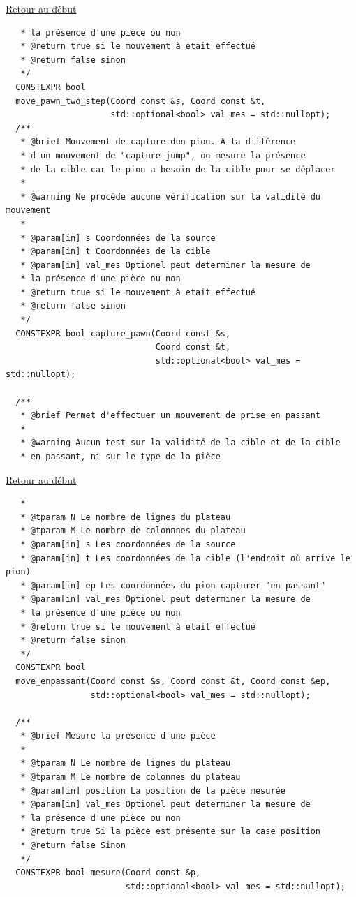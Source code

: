 {\begin{frame}[fragile]
\hyperlink{conclusion}{Retour au début}\newline
\begin{verbatim}
   * la présence d'une pièce ou non
   * @return true si le mouvement à etait effectué
   * @return false sinon
   */
  CONSTEXPR bool
  move_pawn_two_step(Coord const &s, Coord const &t,
                     std::optional<bool> val_mes = std::nullopt);
  /**
   * @brief Mouvement de capture dun pion. A la différence
   * d'un mouvement de "capture jump", on mesure la présence
   * de la cible car le pion a besoin de la cible pour se déplacer
   *
   * @warning Ne procède aucune vérification sur la validité du mouvement
   *
   * @param[in] s Coordonnées de la source
   * @param[in] t Coordonnées de la cible
   * @param[in] val_mes Optionel peut determiner la mesure de
   * la présence d'une pièce ou non
   * @return true si le mouvement à etait effectué
   * @return false sinon
   */
  CONSTEXPR bool capture_pawn(Coord const &s,
                              Coord const &t,
                              std::optional<bool> val_mes = std::nullopt);

  /**
   * @brief Permet d'effectuer un mouvement de prise en passant
   *
   * @warning Aucun test sur la validité de la cible et de la cible
   * en passant, ni sur le type de la pièce
\end{verbatim}
\end{frame}

\begin{frame}[fragile]
\hyperlink{conclusion}{Retour au début}\newline
\begin{verbatim}
   *
   * @tparam N Le nombre de lignes du plateau
   * @tparam M Le nombre de colonnnes du plateau
   * @param[in] s Les coordonnées de la source
   * @param[in] t Les coordonnées de la cible (l'endroit où arrive le pion)
   * @param[in] ep Les coordonnées du pion capturer "en passant"
   * @param[in] val_mes Optionel peut determiner la mesure de
   * la présence d'une pièce ou non
   * @return true si le mouvement à etait effectué
   * @return false sinon
   */
  CONSTEXPR bool
  move_enpassant(Coord const &s, Coord const &t, Coord const &ep,
                 std::optional<bool> val_mes = std::nullopt);

  /**
   * @brief Mesure la présence d'une pièce
   *
   * @tparam N Le nombre de lignes du plateau
   * @tparam M Le nombre de colonnes du plateau
   * @param[in] position La position de la pièce mesurée
   * @param[in] val_mes Optionel peut determiner la mesure de
   * la présence d'une pièce ou non
   * @return true Si la pièce est présente sur la case position
   * @return false Sinon
   */
  CONSTEXPR bool mesure(Coord const &p,
                        std::optional<bool> val_mes = std::nullopt);


\end{verbatim}
\end{frame}}
